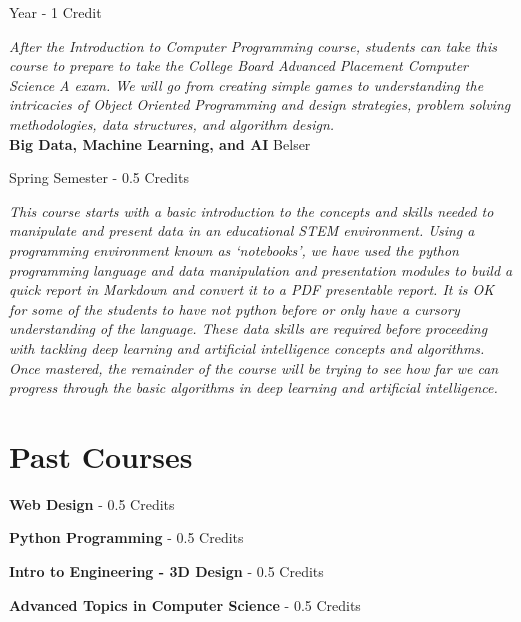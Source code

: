 \noindent Year - 1 Credit

\vspace{1mm}\emph{After the Introduction to Computer Programming course, students can take this course to prepare to take the College Board Advanced Placement Computer Science A exam. We will go from creating simple games to understanding the intricacies of Object Oriented Programming and design strategies, problem solving methodologies, data structures, and algorithm design.}\\


\noindent\textbf{Big Data, Machine Learning, and AI} \hfill Belser

\noindent Spring Semester - 0.5 Credits

\vspace{1mm}\emph{This course starts with a basic introduction to the concepts and skills needed to manipulate and present data in an educational STEM environment. Using a programming environment known as ‘notebooks’, we have used the python programming language and data manipulation and presentation modules to build a quick report in Markdown and convert it to a PDF presentable report. It is OK for some of the students to have not python before or only have a cursory understanding of the language. These data skills are required before proceeding with tackling deep learning and artificial intelligence concepts and algorithms. Once mastered, the remainder of the course will be trying to see how far we can progress through the basic algorithms in deep learning and artificial intelligence.}\\


\section{Past Courses}

\noindent\textbf{Web Design}  - 0.5 Credits

\vspace{3mm}
\noindent\textbf{Python Programming}  - 0.5 Credits

\vspace{3mm}
\noindent\textbf{Intro to Engineering - 3D Design}  - 0.5 Credits

\vspace{3mm}
\noindent\textbf{Advanced Topics in Computer Science}  - 0.5 Credits

\vspace{3mm}